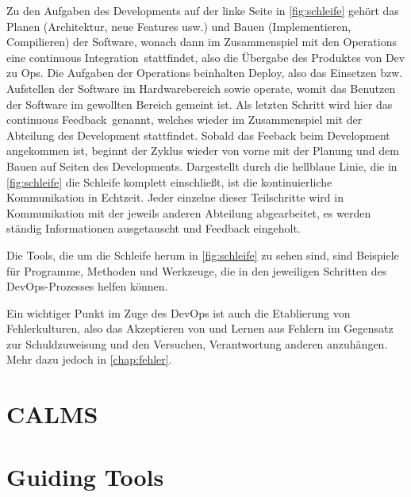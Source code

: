 Zu den Aufgaben des Developments auf der linke Seite in \autoref{fig:schleife} gehört das Planen (Architektur, neue Features usw.) und Bauen (Implementieren, Compilieren) der Software, wonach dann im Zusammenspiel mit den Operations eine \glqq continuous Integration\grqq\ stattfindet, also die Übergabe des Produktes von Dev zu Ops. Die Aufgaben der Operations beinhalten \glqq Deploy\grqq , also das Einsetzen bzw. Aufstellen der Software im Hardwarebereich sowie \glqq operate\grqq , womit das Benutzen der Software im gewollten Bereich gemeint ist. Als letzten Schritt wird hier das \glqq continuous Feedback\grqq\ genannt, welches wieder im Zusammenspiel mit der Abteilung des Development stattfindet. Sobald das Feeback beim Development angekommen ist, beginnt der Zyklus wieder von vorne mit der Planung und dem Bauen auf Seiten des Developments. Dargestellt durch die hellblaue Linie, die in \autoref{fig:schleife} die Schleife komplett einschließt, ist die kontinuierliche Kommunikation in Echtzeit. Jeder einzelne dieser Teilschritte wird in Kommunikation mit der jeweils anderen Abteilung abgearbeitet, es werden ständig Informationen ausgetauscht und Feedback eingeholt.

Die Tools, die um die Schleife herum in \autoref{fig:schleife} zu sehen sind, sind Beispiele für Programme, Methoden und Werkzeuge, die in den jeweiligen Schritten des \ac{DevOps}-Prozesses helfen können.

Ein wichtiger Punkt im Zuge des \ac{DevOps} ist auch die Etablierung von Fehlerkulturen, also das Akzeptieren von und Lernen aus Fehlern im Gegensatz zur Schuldzuweisung und den Versuchen, Verantwortung anderen anzuhängen. Mehr dazu jedoch in \autoref{chap:fehler}.

\section{CALMS}\label{sec:calms}



\section{Guiding Tools}